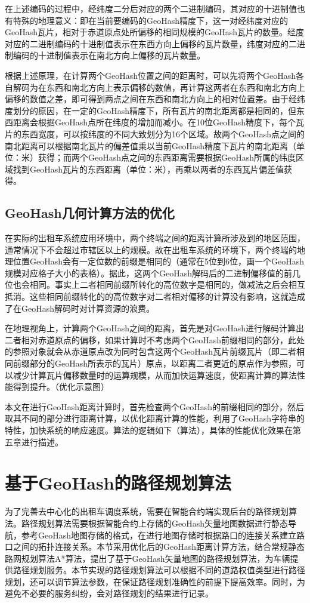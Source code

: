在上述编码的过程中，经纬度二分后对应的两个二进制编码，其对应的十进制值也有特殊的地理意义：即在当前要编码的GeoHash精度下，这一对经纬度对应的GeoHash瓦片，相对于赤道原点处所偏移的相同规模的GeoHash瓦片的数量。经度对应的二进制编码的十进制值表示在东西方向上偏移的瓦片数量，纬度对应的二进制编码的十进制值表示在南北方向上偏移的瓦片数量。

根据上述原理，在计算两个GeoHash位置之间的距离时，可以先将两个GeoHash各自解码为在东西和南北方向上表示偏移的数值，再计算这两者在东西和南北方向上偏移的数值之差，即可得到两点之间在东西和南北方向上的相对位置差。由于经纬度划分的原因，在一定的GeoHash精度下，所有瓦片的南北距离都是相同的，但东西距离会根据GeoHash点所在纬度的增加而减小。在10位GeoHash精度下，每个瓦片的东西宽度，可以按纬度的不同大致划分为16个区域。故两个GeoHash点之间的南北距离可以根据南北瓦片的偏差值乘以当前GeoHash精度下瓦片的南北距离（单位：米）获得；而两个GeoHash点之间的东西距离需要根据GeoHash所属的纬度区域找到GeoHash瓦片的东西距离（单位：米），再乘以两者的东西瓦片偏差值获得。

\subsection{GeoHash几何计算方法的优化}
在实际的出租车系统应用环境中，两个终端之间的距离计算所涉及到的地区范围，通常情况下不会超过市辖区以上的规模。故在出租车系统的环境下，两个终端的地理位置GeoHash会有一定位数的前缀是相同的（通常在5位到6位，画一个GeoHash规模对应格子大小的表格）。据此，这两个GeoHash解码后的二进制偏移值的前几位也会相同。事实上二者相同前缀所转化的高位数字是相同的，做减法之后会相互抵消。这些相同前缀转化的的高位数字对二者相对偏移的计算没有影响，这就造成了在GeoHash解码时对计算资源的浪费。

在地理视角上，计算两个GeoHash之间的距离，首先是对GeoHash进行解码计算出二者相对赤道原点的偏移，如果计算时不考虑两个GeoHash前缀相同的部分，此处的参照对象就会从赤道原点改为同时包含这两个GeoHash瓦片前缀瓦片（即二者相同前缀部分的GeoHash所表示的瓦片）原点，以距离二者更近的原点作为参照，可以减少计算瓦片偏移数量时的运算规模，从而加快运算速度，使距离计算的算法性能得到提升。（优化示意图）

本文在进行GeoHash距离计算时，首先检查两个GeoHash的前缀相同的部分，然后取其不同的部分进行距离计算，以优化距离计算的性能，利用了GeoHash字符串的特性，加快系统的响应速度。算法的逻辑如下（算法），具体的性能优化效果在第五章进行描述。



\section{基于GeoHash的路径规划算法}
为了完善去中心化的出租车调度系统，需要在智能合约端实现后台的路径规划算法。路径规划算法需要根据智能合约上存储的GeoHash矢量地图数据进行静态导航，参考GeoHash地图存储的格式，在进行地图存储时根据路口的连接关系建立路口之间的拓扑连接关系。本节采用优化后的GeoHash距离计算方法，结合常规静态路网规划算法A*算法，提出了基于GeoHash矢量地图的路径规划算法，为车辆提供路径规划服务。本节实现的路径规划算法可以根据不同的道路权值类型进行路径规划，还可以调节算法参数，在保证路径规划准确性的前提下提高效率。同时，为避免不必要的服务纠纷，会对路径规划的结果进行记录。

